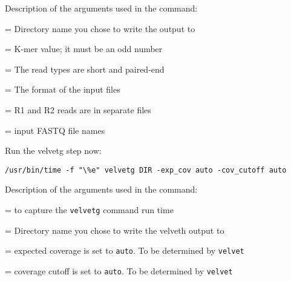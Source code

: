 Description of the arguments used in the command:
\begin{description}[style=multiline,labelindent=0cm,align=right,leftmargin=\descriptionlabelspace,rightmargin=1.5cm,font=\ttfamily]
  \item[DIR] = Directory name you chose to write the output to
  \item[K] = K-mer value; it must be an odd number
  \item[-shortPaired] = The read types are short and paired-end
  \item[-fastq.gz] = The format of the input files
  \item[-separate] = R1 and R2 reads are in separate files
  \item[input file names] = input FASTQ file names
\end{description}


\begin{steps}
Run the velvetg step now:
\begin{lstlisting}
/usr/bin/time -f "\%e" velvetg DIR -exp_cov auto -cov_cutoff auto
\end{lstlisting}
\end{steps}

Description of the arguments used in the command:
\begin{description}[style=multiline,labelindent=0cm,align=right,leftmargin=\descriptionlabelspace,rightmargin=1.5cm,font=\ttfamily]
  \item[time] = to capture the \texttt{velvetg} command run time
  \item[DIR] = Directory name you chose to write the velveth output to
  \item[-exp\_cov] = expected coverage is set to \texttt{auto}. To be determined by \texttt{velvet}
  \item[-cov\_cutoff] = coverage cutoff is set to \texttt{auto}. To be determined by \texttt{velvet}
\end{description}

